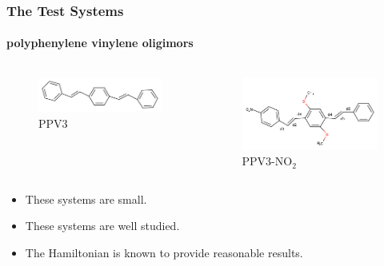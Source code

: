 \documentclass{beamer}
\begin{document}
\begin{frame}
  \frametitle{The Test Systems}
  \framesubtitle{polyphenylene vinylene oligimors}
\begin{columns}[b]
 \begin{figure}
  \includegraphics[width=\textwidth]{Images/ppv3.png}
  \caption{PPV3}
 \end{figure}
 \begin{figure}
  \includegraphics[width=\textwidth]{Images/ppvno2.png}
  \caption{PPV3-NO$_2$}
 \end{figure}
\end{columns}
\begin{block}{}
  \begin{itemize}
    \item These systems are small.
    \item These systems are well studied.
    \item The Hamiltonian is known to provide reasonable results.
  \end{itemize}
\end{block}
\end{frame}
\end{document}
